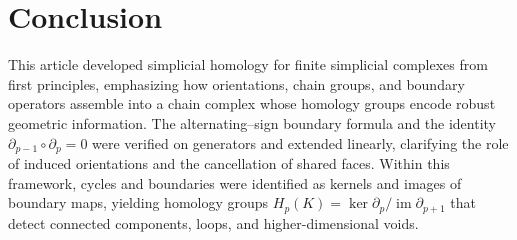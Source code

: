 \documentclass[12pt,oneside,reqno]{amsart}
\theoremstyle{plain}
\theoremstyle{definition}
\newtheorem{example}{Example}[section]
\theoremstyle{remark}
\newcommand{\0}{{\textbf{0}}}
\begin{document}

\section{Conclusion}

This article developed simplicial homology for finite simplicial complexes from first principles, emphasizing how orientations, chain groups, and boundary operators assemble into a chain complex whose homology groups encode robust geometric information. The alternating–sign boundary formula and the identity \(\partial_{p-1}\circ \partial_p=0\) were verified on generators and extended linearly, clarifying the role of induced orientations and the cancellation of shared faces. Within this framework, cycles and boundaries were identified as kernels and images of boundary maps, yielding homology groups \(H_p(K)=\ker \partial_p / \operatorname{im}\partial_{p+1}\) that detect connected components, loops, and higher-dimensional voids.
\end{document}
